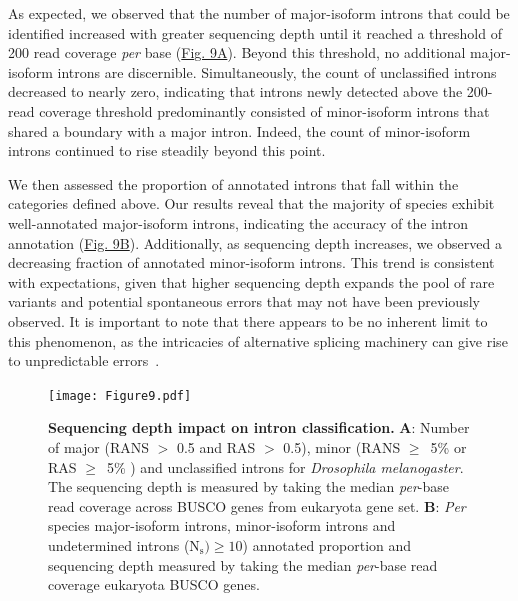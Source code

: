 As expected, we observed that the number of major-isoform introns that could be identified increased with greater sequencing depth until it reached a threshold of 200 read coverage \textit{per} base (\hyperref[fig:gtdrift9]{Fig. 9A}). Beyond this threshold, no additional major-isoform introns are discernible. Simultaneously, the count of unclassified introns decreased to nearly zero, indicating that introns newly detected above the 200-read coverage threshold predominantly consisted of minor-isoform introns that shared a boundary with a major intron. Indeed, the count of minor-isoform introns continued to rise steadily beyond this point.

We then assessed the proportion of annotated introns that fall within the categories defined above. Our results reveal that the majority of species exhibit well-annotated major-isoform introns, indicating the accuracy of the intron annotation (\hyperref[fig:gtdrift9]{Fig. 9B}). Additionally, as sequencing depth increases, we observed a decreasing fraction of annotated minor-isoform introns. This trend is consistent with expectations, given that higher sequencing depth expands the pool of rare variants and potential spontaneous errors that may not have been previously observed. It is important to note that there appears to be no inherent limit to this phenomenon, as the intricacies of alternative splicing machinery can give rise to unpredictable errors~\citep{benitiere_random_2024}.

\begin{figure}[t]  
         \centering
        \texttt{[image: Figure9.pdf]}
                                                                           
    \caption[Sequencing depth impact on intron classification]{\textbf{Sequencing depth impact on intron classification.} \textbf{A}: Number of major (RANS $>$ 0.5 and RAS $>$ 0.5), minor (RANS $\geq$~5\% or RAS $\geq$~5\% ) and unclassified introns for \emph{Drosophila melanogaster}. The sequencing depth is measured by taking the median \textit{per}-base read coverage across \acrshort{BUSCO} genes from eukaryota gene set. \textbf{B}: \textit{Per} species major-isoform introns, minor-isoform introns and undetermined introns ($\mathrm{N_s})\geq10$) annotated proportion and sequencing depth measured by taking the median \textit{per}-base read coverage eukaryota \acrshort{BUSCO} genes.\newline}
    \label{fig:gtdrift9}
\end{figure}


